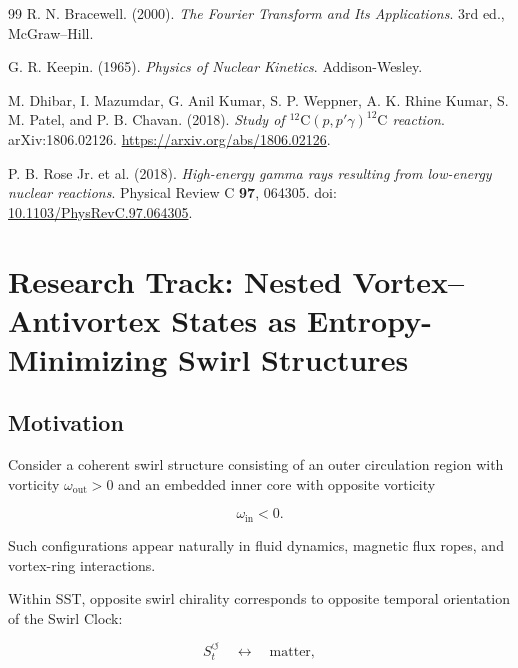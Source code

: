 \begin{thebibliography}{99}
        R. N. Bracewell. (2000).
        \textit{The Fourier Transform and Its Applications}.
        3rd ed., McGraw--Hill.
        
        G. R. Keepin. (1965).
        \textit{Physics of Nuclear Kinetics}.
        Addison-Wesley.
        
        M. Dhibar, I. Mazumdar, G. Anil Kumar, S. P. Weppner, A. K. Rhine Kumar, S. M. Patel, and P. B. Chavan. (2018).
        \textit{Study of \(^{12}\mathrm C(p,p'\gamma)^{12}\mathrm C\) reaction}.
        arXiv:1806.02126.
        \href{https://arxiv.org/abs/1806.02126}{https://arxiv.org/abs/1806.02126}.
        
        P. B. Rose Jr. et al. (2018).
        \textit{High-energy gamma rays resulting from low-energy nuclear reactions}.
        Physical Review C \textbf{97}, 064305.
        doi: \href{https://doi.org/10.1103/PhysRevC.97.064305}{10.1103/PhysRevC.97.064305}.
    
    \end{thebibliography}



\section{Research Track: Nested Vortex--Antivortex States as Entropy-Minimizing Swirl Structures}
    
    \subsection{Motivation}
        
        Consider a coherent swirl structure consisting of an outer circulation region
        with vorticity $\omega_{\mathrm{out}}>0$ and an embedded inner core with
        opposite vorticity
        
        \[
            \omega_{\mathrm{in}}<0.
        \]
        
        Such configurations appear naturally in fluid dynamics, magnetic flux ropes,
        and vortex-ring interactions.
        
        Within SST, opposite swirl chirality corresponds to opposite temporal
        orientation of the Swirl Clock:
        
        \[
            S_t^{\circlearrowleft}
            \quad\leftrightarrow\quad
            \text{matter},
        \]
        
